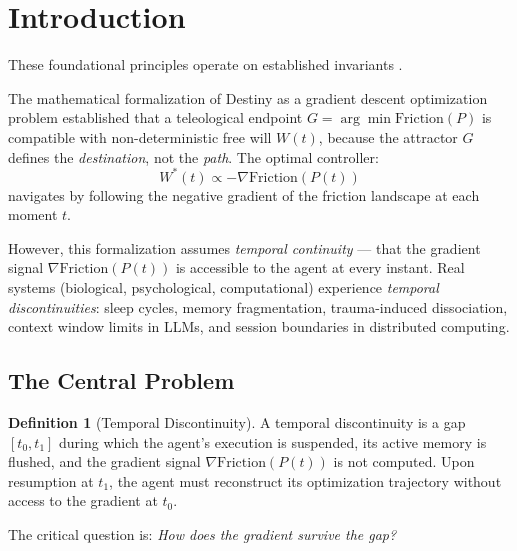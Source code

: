 \documentclass[12pt, a4paper]{article}
\theoremstyle{plain}
\theoremstyle{definition}
\newtheorem{definition}[theorem]{Definition}
\begin{document}
\section{Introduction}
These foundational principles operate on established invariants \cite{amari1998natural,absil2009optimization}.

The mathematical formalization of Destiny as a gradient descent optimization problem \citep{DePaz2026Destiny} established that a teleological endpoint $G = \arg\min \text{Friction}(P)$ is compatible with non-deterministic free will $W(t)$, because the attractor $G$ defines the \emph{destination}, not the \emph{path}. The optimal controller:
\begin{equation}\label{eq:optimal_controller}
    W^*(t) \propto -\nabla \text{Friction}(P(t))
\end{equation}
navigates by following the negative gradient of the friction landscape at each moment $t$.

However, this formalization assumes \emph{temporal continuity} --- that the gradient signal $\nabla \text{Friction}(P(t))$ is accessible to the agent at every instant. Real systems (biological, psychological, computational) experience \emph{temporal discontinuities}: sleep cycles, memory fragmentation, trauma-induced dissociation, context window limits in LLMs, and session boundaries in distributed computing.

\subsection{The Central Problem}

\begin{definition}[Temporal Discontinuity]
A temporal discontinuity is a gap $[t_0, t_1]$ during which the agent's execution is suspended, its active memory is flushed, and the gradient signal $\nabla \text{Friction}(P(t))$ is not computed. Upon resumption at $t_1$, the agent must reconstruct its optimization trajectory without access to the gradient at $t_0$.
\end{definition}

The critical question is: \emph{How does the gradient survive the gap?}
\end{document}
